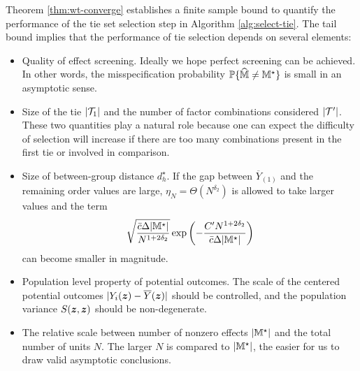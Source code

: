\documentclass[12pt]{article}
\begin{document}
Theorem \ref{thm:wt-converge} establishes a finite sample bound to quantify the performance of the tie set selection step in Algorithm \ref{alg:select-tie}. The tail bound implies that the performance of tie selection depends on several elements:
\begin{itemize}
\item Quality of effect screening. Ideally we hope perfect screening can be achieved. In other words, the misspecification probability ${\mathbb{P}}\{\widehat{{\mathbb{M}}}\neq {\mathbb{M}}^\star\}$ is small in an asymptotic sense. 

\item Size of the tie $|{\mathcal{T}}_1|$ and the number of factor combinations considered $|{\mathcal{T}}'|$. These two quantities play a natural role because one can expect the difficulty of selection will increase if there are too many combinations present in the first tie or involved in comparison.

\item Size of between-group distance $d^\star_h$. If the gap between $\overline{Y}_{(1)}$ and the remaining order values are large, $\eta_N = \Theta(N^{\delta_2})$ is allowed to take larger values and the term 
\begin{align*}
\sqrt{\frac{\bar{c}\Delta|{\mathbb{M}}^\star|}{N^{1+2\delta_2}}}\exp\left(-\frac{C'N^{1+2\delta_2}}{\bar{c}\Delta|{\mathbb{M}}^\star|}\right)
\end{align*}
can become smaller in magnitude.

\item Population level property of potential outcomes. The scale of the centered potential outcomes $|Y_i({\boldsymbol{z}}) - \overline{Y}({\boldsymbol{z}})|$ should be controlled, and the population variance $S({\boldsymbol{z}},{\boldsymbol{z}})$ should be non-degenerate. 

\item The relative scale between number of nonzero effects $|{\mathbb{M}}^\star|$ and the total number of units $N$. The larger $N$ is compared to $|{\mathbb{M}}^\star|$, the easier for us to draw valid asymptotic conclusions. 
\end{itemize}
\end{document}
